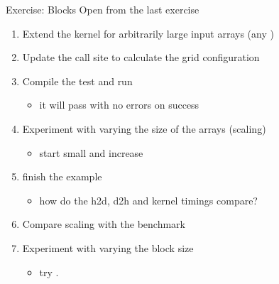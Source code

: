 \begin{frame}[fragile]{Exercise: Blocks}
    Open  from the last exercise
    \begin{enumerate}
        \item Extend the \axpy kernel for arbitrarily large input arrays (any )

        \item Update the call site to calculate the grid configuration

        \item Compile the test and run
        \begin{itemize}
            \item it will pass with no errors on success
        \end{itemize}

        \item Experiment with varying the size of the arrays (scaling)
        \begin{itemize}
            \item start small and increase
        \end{itemize}

        \item finish the  example
        \begin{itemize}
            \item how do the h2d, d2h and kernel timings compare?
        \end{itemize}

        \item \extra Compare scaling with the  benchmark

        \item \extra Experiment with varying the block size
        \begin{itemize}
            \item try .
        \end{itemize}

    \end{enumerate}

\end{frame}

